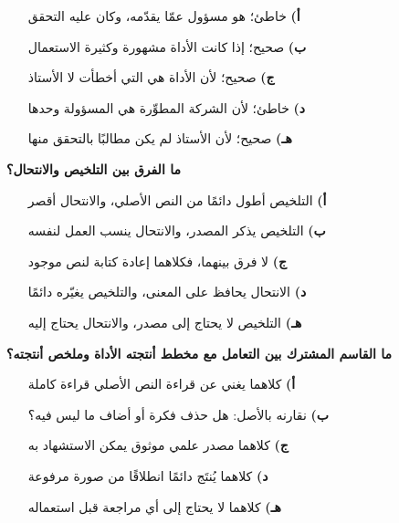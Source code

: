 \documentclass[11pt,a4paper]{article}
\begin{document}
\begin{multicols}{2}
\begin{minipage}{\linewidth}
\begin{itemize}[leftmargin=0.95cm, labelsep=4pt, itemsep=0pt, topsep=2pt, parsep=0pt]
  \item[\textbf{أ)}] خاطئ؛ هو مسؤول عمّا يقدّمه، وكان عليه التحقق
  \item[\textbf{ب)}] صحيح؛ إذا كانت الأداة مشهورة وكثيرة الاستعمال
  \item[\textbf{ج)}] صحيح؛ لأن الأداة هي التي أخطأت لا الأستاذ
  \item[\textbf{د)}] خاطئ؛ لأن الشركة المطوِّرة هي المسؤولة وحدها
  \item[\textbf{هـ)}] صحيح؛ لأن الأستاذ لم يكن مطالبًا بالتحقق منها
\end{itemize}
\end{minipage}\par\vspace{7pt plus 4pt}
\noindent\begin{minipage}{\linewidth}
\hangindent=0.7cm\textbf{ما الفرق بين التلخيص والانتحال؟}
\begin{itemize}[leftmargin=0.95cm, labelsep=4pt, itemsep=0pt, topsep=2pt, parsep=0pt]
  \item[\textbf{أ)}] التلخيص أطول دائمًا من النص الأصلي، والانتحال أقصر
  \item[\textbf{ب)}] التلخيص يذكر المصدر، والانتحال ينسب العمل لنفسه
  \item[\textbf{ج)}] لا فرق بينهما، فكلاهما إعادة كتابة لنص موجود
  \item[\textbf{د)}] الانتحال يحافظ على المعنى، والتلخيص يغيّره دائمًا
  \item[\textbf{هـ)}] التلخيص لا يحتاج إلى مصدر، والانتحال يحتاج إليه
\end{itemize}
\end{minipage}\par\vspace{7pt plus 4pt}
\noindent\begin{minipage}{\linewidth}
\hangindent=0.7cm\textbf{ما القاسم المشترك بين التعامل مع مخطط أنتجته الأداة وملخص أنتجته؟}
\begin{itemize}[leftmargin=0.95cm, labelsep=4pt, itemsep=0pt, topsep=2pt, parsep=0pt]
  \item[\textbf{أ)}] كلاهما يغني عن قراءة النص الأصلي قراءة كاملة
  \item[\textbf{ب)}] نقارنه بالأصل: هل حذف فكرة أو أضاف ما ليس فيه؟
  \item[\textbf{ج)}] كلاهما مصدر علمي موثوق يمكن الاستشهاد به
  \item[\textbf{د)}] كلاهما يُنتَج دائمًا انطلاقًا من صورة مرفوعة
  \item[\textbf{هـ)}] كلاهما لا يحتاج إلى أي مراجعة قبل استعماله
\end{itemize}
\end{minipage}\par\vspace{7pt plus 4pt}
\end{multicols}
\end{document}
